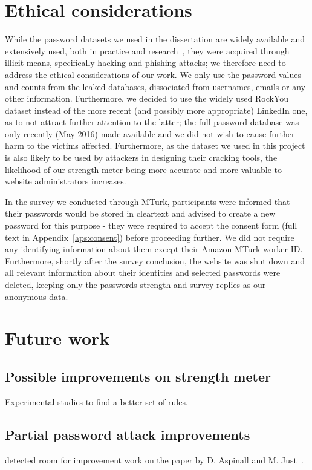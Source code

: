   \section{Ethical considerations}
    \label{sec:ethical}
    While the password datasets we used in the dissertation are widely available and extensively used, both in practice and research~\cite{pass_strength_empirical,pass_strength,NIST_invalid,rockyou1}, they were acquired through illicit means, specifically hacking and phishing attacks; we therefore need to address the ethical considerations of our work. We only use the password values and counts from the leaked databases, dissociated from usernames, emails or any other information. Furthermore, we decided to use the widely used RockYou dataset instead of the more recent (and possibly more appropriate) LinkedIn one, as to not attract further attention to the latter; the full password database was only recently (May 2016) made available and we did not wish to cause further harm to the victims affected. Furthermore, as the dataset we used in this project is also likely to be used by attackers in designing their cracking tools, the likelihood of our strength meter being more accurate and more valuable to website administrators increases.

    In the survey we conducted through MTurk, participants were informed that their passwords would be stored in cleartext and advised to create a new password for this purpose - they were required to accept the consent form (full text in Appendix~\ref{aps:consent}) before proceeding further. We did not require any identifying information about them except their Amazon MTurk worker ID. Furthermore, shortly after the survey conclusion, the website was shut down and all relevant information about their identities and selected passwords were deleted, keeping only the passwords strength and survey replies as our anonymous data.

  \section{Future work}
    \label{sec:future_work}

    \subsection{Possible improvements on strength meter}
      \label{ssec:meter_improvements}
      Experimental studies to find a better set of rules.

    \subsection{Partial password attack improvements}
      \label{ssec:attack_improvements}
      detected room for improvement work on the paper by D. Aspinall and M. Just~\cite{part_pass}.

